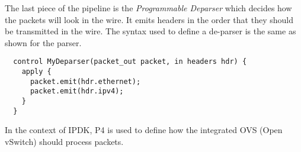 \documentclass[../sn.tex]{subfiles}
\begin{document}
The last piece of the pipeline is the \emph{Programmable Deparser} which decides how the packets will look in the wire.
It emits headers in the order that they should be transmitted in the wire.
The syntax used to define a de-parser is the same as shown for the parser.
\begin{lstlisting}
  control MyDeparser(packet_out packet, in headers hdr) {
    apply {
      packet.emit(hdr.ethernet);
      packet.emit(hdr.ipv4);
    }
  }
\end{lstlisting}
In the context of IPDK, P4 is used to define how the integrated OVS (Open vSwitch) should process packets. 
\clearpage
\end{document}
